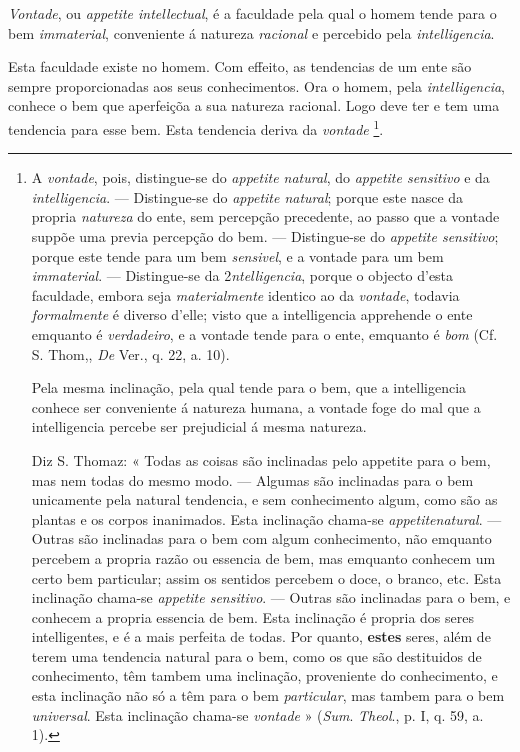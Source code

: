 
  
\emph{Vontade}, ou \emph{appetite intellectual}, é a faculdade pela qual o homem tende para o bem \emph{immaterial}, conveniente á natureza \emph{racional} e percebido pela \emph{intelligencia}.

Esta faculdade existe no homem. Com effeito, as tendencias de um ente são sempre proporcionadas aos seus conhecimentos. Ora o homem, pela \emph{intelligencia}, conhece o bem que aperfeiçõa a sua natureza racional. Logo deve ter e tem uma tendencia para esse bem. Esta tendencia deriva da \emph{vontade} \footnote{A \emph{vontade}, pois, distingue-se do \emph{appetite natural}, do \emph{appetite sensitivo} e da \emph{intelligencia}. --- Distingue-se do \emph{appetite natural}; porque este nasce da propria \emph{natureza} do ente, sem percepção precedente, ao passo que a vontade suppõe uma previa percepção do bem. --- Distingue-se do \emph{appetite sensitivo}; porque este tende para um bem \emph{sensivel}, e a vontade para um bem \emph{immaterial}. --- Distingue-se da 2\emph{ntelligencia}, porque o objecto d'esta faculdade, embora seja \emph{materialmente} identico ao da \emph{vontade}, todavia \emph{formalmente} é diverso d'elle; visto que a intelligencia apprehende o ente emquanto é \emph{verdadeiro}, e a vontade tende para o ente, emquanto é \emph{bom} (Cf. S. Thom,, \emph{De} Ver., q. 22, a. 10).\par Pela mesma inclinação, pela qual tende para o bem, que a intelligencia conhece ser conveniente á natureza humana, a vontade foge do mal que a intelligencia percebe ser prejudicial á mesma natureza.\par Diz S. Thomaz: « Todas as coisas são inclinadas pelo appetite para o bem, mas nem todas do mesmo modo. --- Algumas são inclinadas para o bem unicamente pela natural tendencia, e sem conhecimento algum, como são as plantas e os corpos inanimados. Esta inclinação chama-se \emph{appetite}\emph{natural}. --- Outras são inclinadas para o bem com algum conhecimento, não emquanto percebem a propria razão ou essencia de bem, mas emquanto conhecem um certo bem particular; assim os sentidos percebem o doce, o branco, etc. Esta inclinação chama-se \emph{appetite sensitivo}. --- Outras são inclinadas para o bem, e conhecem a propria essencia de bem. Esta inclinação é propria dos seres intelligentes, e é a mais perfeita de todas. Por quanto, \textbf{estes} seres, além de terem uma tendencia natural para o bem, como os que são destituidos de conhecimento, têm tambem uma inclinação, proveniente do conhecimento, e esta inclinação não só a têm para o bem \emph{particular}, mas tambem para o bem \emph{universal}. Esta inclinação chama-se \emph{vontade} » (\emph{Sum}. \emph{Theol}., p. I, q. 59, a. 1).}.


